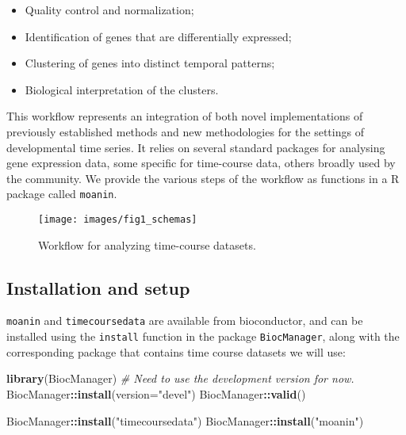 \documentclass[9pt,a4paper,]{extarticle}
\newenvironment{Shaded}{\begin{snugshade}}{\end{snugshade}}
\newcommand{\CommentTok}[1]{\textcolor[rgb]{0.56,0.35,0.01}{\textit{#1}}}
\newcommand{\DataTypeTok}[1]{\textcolor[rgb]{0.13,0.29,0.53}{#1}}
\newcommand{\KeywordTok}[1]{\textcolor[rgb]{0.13,0.29,0.53}{\textbf{#1}}}
\newcommand{\NormalTok}[1]{#1}
\newcommand{\OperatorTok}[1]{\textcolor[rgb]{0.81,0.36,0.00}{\textbf{#1}}}
\newcommand{\StringTok}[1]{\textcolor[rgb]{0.31,0.60,0.02}{#1}}
\begin{document}
\begin{itemize}
\tightlist
\item
  Quality control and normalization;
\item
  Identification of genes that are differentially expressed;
\item
  Clustering of genes into distinct temporal patterns;
\item
  Biological interpretation of the clusters.
\end{itemize}

This workflow represents an integration of both novel implementations of
previously established methods and new methodologies for the settings of
developmental time series. It relies on several standard packages for
analysing gene expression data, some specific for time-course data, others
broadly used by the community. We provide the various steps of the workflow as
functions in a R package called \texttt{moanin}.

\begin{figure}[H]

{\centering \texttt{[image: images/fig1\_schemas]} 

}

\caption{Workflow for analyzing time-course datasets.}\label{fig:schema}
\end{figure}

\hypertarget{installation-and-setup}{%
\subsection{Installation and setup}\label{installation-and-setup}}

\texttt{moanin} and \texttt{timecoursedata} are available from bioconductor, and can be
installed using the \texttt{install} function in the package \texttt{BiocManager}, along
with the corresponding package that contains time course datasets we will use:

\begin{Shaded}
\begin{Highlighting}[]
\KeywordTok{library}\NormalTok{(BiocManager)}
\CommentTok{# Need to use the development version for now.}
\NormalTok{BiocManager}\OperatorTok{::}\KeywordTok{install}\NormalTok{(}\DataTypeTok{version=}\StringTok{"devel"}\NormalTok{)}
\NormalTok{BiocManager}\OperatorTok{::}\KeywordTok{valid}\NormalTok{()}

\NormalTok{BiocManager}\OperatorTok{::}\KeywordTok{install}\NormalTok{(}\StringTok{"timecoursedata"}\NormalTok{)}
\NormalTok{BiocManager}\OperatorTok{::}\KeywordTok{install}\NormalTok{(}\StringTok{"moanin"}\NormalTok{)}
\end{Highlighting}
\end{Shaded}
\end{document}
